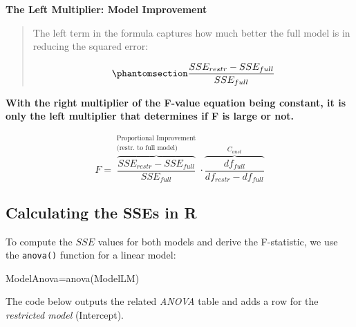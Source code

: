 \documentclass[
  letterpaper,
  DIV=11,
  numbers=noendperiod]{scrartcl}
\newenvironment{Shaded}{\begin{snugshade}}{\end{snugshade}}
\newcommand{\FunctionTok}[1]{\textcolor[rgb]{0.28,0.35,0.67}{#1}}
\newcommand{\NormalTok}[1]{\textcolor[rgb]{0.00,0.23,0.31}{#1}}
\newcommand{\OtherTok}[1]{\textcolor[rgb]{0.00,0.23,0.31}{#1}}
\begin{document}
\textbf{The Left Multiplier: Model Improvement}

\begin{quote}
The left term in the formula captures how much better the full model is
in reducing the squared error:

\begin{equation}\phantomsection\label{eq-ProportionOfImprovement}{
\frac{SSE_{restr}-SSE_{full}}{SSE_{full}}
}\end{equation}
\end{quote}

\textbf{With the right multiplier of the F-value equation being
constant, it is only the left multiplier that determines if F is large
or not.}

\[
 F = \overbrace{\frac{SSE_{restr}-SSE_{full}}{SSE_{full}}}^{
\begin{array}{c}\text{Proportional Improvement}\\
                \text{(restr. to full model)}
\end{array}} \cdot
   \overbrace{\frac{df_{full}}{df_{restr}-df_{full}}}^{C_{onst}}
\]

\subsection{Calculating the SSEs in R}\label{calculating-the-sses-in-r}

To compute the \(SSE\) values for both models and derive the
F-statistic, we use the \texttt{anova()} function for a linear model:

\begin{Shaded}
\begin{Highlighting}[]
\NormalTok{ModelAnova}\OtherTok{=}\FunctionTok{anova}\NormalTok{(ModelLM)}
\end{Highlighting}
\end{Shaded}

The code below outputs the related \emph{ANOVA} table and adds a row for
the \emph{restricted model} (Intercept).
\end{document}
